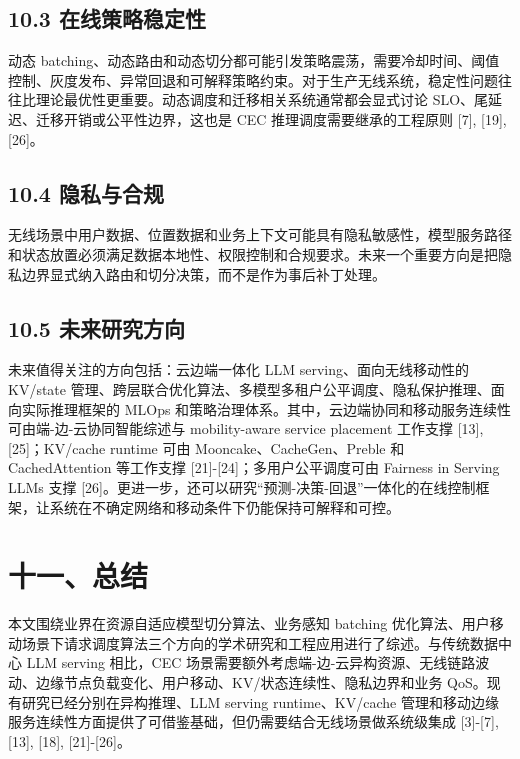 \documentclass[a4paper,10pt]{ctexart}
\begin{document}
\subsection*{10.3 在线策略稳定性}

动态 batching、动态路由和动态切分都可能引发策略震荡，需要冷却时间、阈值控制、灰度发布、异常回退和可解释策略约束。对于生产无线系统，稳定性问题往往比理论最优性更重要。动态调度和迁移相关系统通常都会显式讨论 SLO、尾延迟、迁移开销或公平性边界，这也是 CEC 推理调度需要继承的工程原则 [7], [19], [26]。


\subsection*{10.4 隐私与合规}

无线场景中用户数据、位置数据和业务上下文可能具有隐私敏感性，模型服务路径和状态放置必须满足数据本地性、权限控制和合规要求。未来一个重要方向是把隐私边界显式纳入路由和切分决策，而不是作为事后补丁处理。


\subsection*{10.5 未来研究方向}

未来值得关注的方向包括：云边端一体化 LLM serving、面向无线移动性的 KV/state 管理、跨层联合优化算法、多模型多租户公平调度、隐私保护推理、面向实际推理框架的 MLOps 和策略治理体系。其中，云边端协同和移动服务连续性可由端-边-云协同智能综述与 mobility-aware service placement 工作支撑 [13], [25]；KV/cache runtime 可由 Mooncake、CacheGen、Preble 和 CachedAttention 等工作支撑 [21]-[24]；多用户公平调度可由 Fairness in Serving LLMs 支撑 [26]。更进一步，还可以研究“预测-决策-回退”一体化的在线控制框架，让系统在不确定网络和移动条件下仍能保持可解释和可控。


\section*{十一、总结}

本文围绕业界在资源自适应模型切分算法、业务感知 batching 优化算法、用户移动场景下请求调度算法三个方向的学术研究和工程应用进行了综述。与传统数据中心 LLM serving 相比，CEC 场景需要额外考虑端-边-云异构资源、无线链路波动、边缘节点负载变化、用户移动、KV/状态连续性、隐私边界和业务 QoS。现有研究已经分别在异构推理、LLM serving runtime、KV/cache 管理和移动边缘服务连续性方面提供了可借鉴基础，但仍需要结合无线场景做系统级集成 [3]-[7], [13], [18], [21]-[26]。
\end{document}
